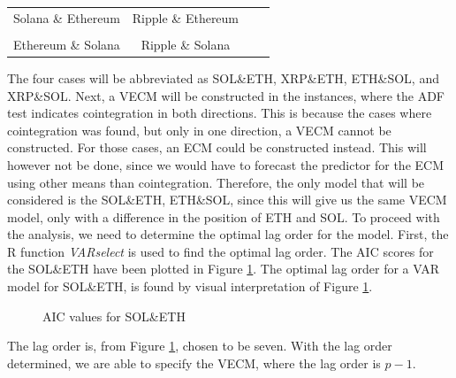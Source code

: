 \pause
\begin{center}
\begin{tabular}{cccc}
   Solana \& Ethereum \quad & \quad Ripple \& Ethereum\\\\
   Ethereum \& Solana \quad & \quad Ripple \& Solana
\end{tabular}
\end{center}
\pause
\noindent The four cases will be abbreviated as SOL\&ETH, XRP\&ETH, ETH\&SOL, and XRP\&SOL. Next, a VECM will be constructed in the instances, where the ADF test indicates cointegration in both directions. This is because the cases where cointegration was found, but only in one direction, a VECM cannot be constructed. For those cases, an ECM could be constructed instead. This will however not be done, since we would have to forecast the predictor for the ECM using other means than cointegration. Therefore, the only model that will be considered is the SOL\&ETH, ETH\&SOL, since this will give us the same VECM model, only with a difference in the position of ETH and SOL. To proceed with the analysis, we need to determine the optimal lag order for the model. First, the R function \textit{VARselect} is used to find the optimal lag order. The AIC scores for the SOL\&ETH have been plotted in Figure \ref{fig:AIC_plots}. The optimal lag order for a VAR model for SOL\&ETH, is found by visual interpretation of Figure \ref{fig:AIC_plots}.
\begin{figure}[H]
  \centering
  \quad
  
  \caption{AIC values for SOL\&ETH}
  \label{fig:AIC_plots}
\end{figure}
\noindent The lag order is, from Figure \ref{fig:AIC_plots}, chosen to be seven. With the lag order determined, we are able to specify the VECM, where the lag order is $p-1$.

